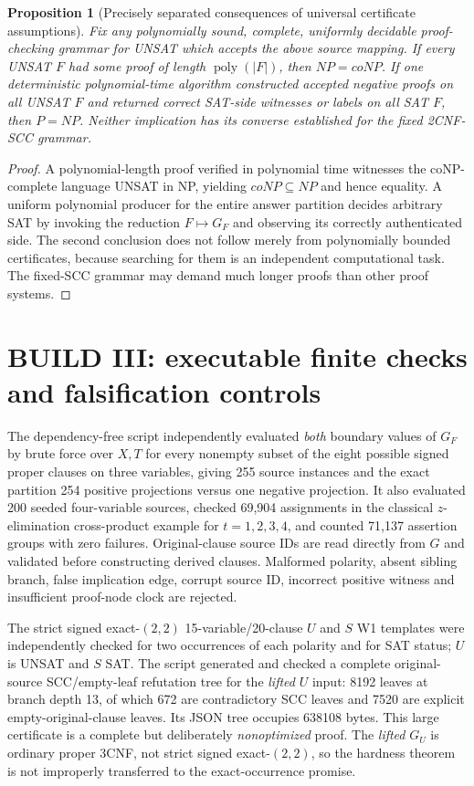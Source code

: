 \documentclass[11pt]{article}
\newtheorem{proposition}[theorem]{Proposition}
\begin{document}
\begin{proposition}[Precisely separated consequences of universal certificate assumptions]\label{prop:gap}
Fix any polynomially sound, complete, uniformly decidable proof-checking grammar for UNSAT which accepts the above source mapping. If every UNSAT $F$ had some proof of length $\operatorname{poly}(|F|)$, then $NP=coNP$. If one deterministic \emph{polynomial-time} algorithm constructed accepted negative proofs on all UNSAT $F$ and returned correct SAT-side witnesses or labels on all SAT $F$, then $P=NP$. Neither implication has its converse established for the fixed 2CNF-SCC grammar.
\end{proposition}
\begin{proof}
A polynomial-length proof verified in polynomial time witnesses the coNP-complete language UNSAT in NP, yielding $coNP\subseteq NP$ and hence equality. A uniform polynomial producer for the entire answer partition decides arbitrary SAT by invoking the reduction $F\mapsto G_F$ and observing its correctly authenticated side. The second conclusion does not follow merely from polynomially bounded certificates, because searching for them is an independent computational task. The fixed-SCC grammar may demand much longer proofs than other proof systems.
\end{proof}

\section{BUILD III: executable finite checks and falsification controls}
The dependency-free script  independently evaluated \emph{both} boundary values of $G_F$ by brute force over $X,T$ for every nonempty subset of the eight possible signed proper clauses on three variables, giving 255 source instances and the exact partition 254 positive projections versus one negative projection. It also evaluated 200 seeded four-variable sources, checked 69,904 assignments in the classical $z$-elimination cross-product example for $t=1,2,3,4$, and counted 71,137 assertion groups with zero failures. Original-clause source IDs are read directly from $G$ and validated before constructing derived clauses. Malformed polarity, absent sibling branch, false implication edge, corrupt source ID, incorrect positive witness and insufficient proof-node clock are rejected.

The strict signed exact-$(2,2)$ 15-variable/20-clause $U$ and $S$ W1 templates were independently checked for two occurrences of each polarity and for SAT status; $U$ is UNSAT and $S$ SAT. The script generated and checked a complete original-source SCC/empty-leaf refutation tree for the \emph{lifted} $U$ input: 8192 leaves at branch depth 13, of which 672 are contradictory SCC leaves and 7520 are explicit empty-original-clause leaves. Its JSON tree occupies 638108 bytes. This large certificate is a complete but deliberately \emph{nonoptimized} proof. The \emph{lifted} $G_U$ is ordinary proper 3CNF, not strict signed exact-$(2,2)$, so the hardness theorem is not improperly transferred to the exact-occurrence promise.
\end{document}
